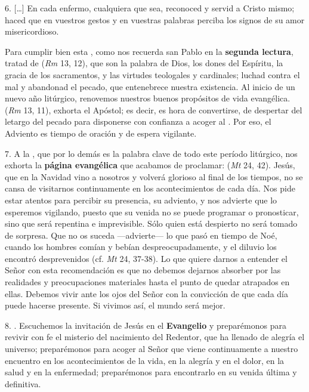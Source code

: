 \begin{body}
6. [\ldots{}] En cada enfermo, cualquiera que sea, reconoced y servid a Cristo mismo; haced que en vuestros gestos y en vuestras palabras perciba los signos de su amor misericordioso.

Para cumplir bien esta , como nos recuerda san Pablo en la \textbf{segunda lectura}, tratad de  (\emph{Rm} 13, 12), que son la palabra de Dios, los dones del Espíritu, la gracia de los sacramentos, y las virtudes teologales y cardinales; luchad contra el mal y abandonad el pecado, que entenebrece nuestra existencia. Al inicio de un nuevo año litúrgico, renovemos nuestros buenos propósitos de vida evangélica.  (\emph{Rm} 13, 11), exhorta el Apóstol; es decir, es hora de convertirse, de despertar del letargo del pecado para disponerse con confianza a acoger al . Por eso, el Adviento es tiempo de oración y de espera vigilante.

7. A la , que por lo demás es la palabra clave de todo este período litúrgico, nos exhorta la \textbf{página evangélica} que acabamos de proclamar:  (\emph{Mt} 24, 42). Jesús, que en la Navidad vino a nosotros y volverá glorioso al final de los tiempos, no se cansa de visitarnos continuamente en los acontecimientos de cada día. Nos pide estar atentos para percibir su presencia, su adviento, y nos advierte que lo esperemos vigilando, puesto que su venida no se puede programar o pronosticar, sino que será repentina e imprevisible. Sólo quien está despierto no será tomado de sorpresa. Que no os suceda ---advierte--- lo que pasó en tiempo de Noé, cuando los hombres comían y bebían despreocupadamente, y el diluvio los encontró desprevenidos (cf. \emph{Mt} 24, 37-38). Lo que quiere darnos a entender el Señor con esta recomendación es que no debemos dejarnos absorber por las realidades y preocupaciones materiales hasta el punto de quedar atrapados en ellas. Debemos vivir ante los ojos del Señor con la convicción de que cada día puede hacerse presente. Si vivimos así, el mundo será mejor.

8. . Escuchemos la invitación de Jesús en el \textbf{Evangelio} y preparémonos para revivir con fe el misterio del nacimiento del Redentor, que ha llenado de alegría el universo; preparémonos para acoger al Señor que viene continuamente a nuestro encuentro en los acontecimientos de la vida, en la alegría y en el dolor, en la salud y en la enfermedad; preparémonos para encontrarlo en su venida última y definitiva.


\end{body}
